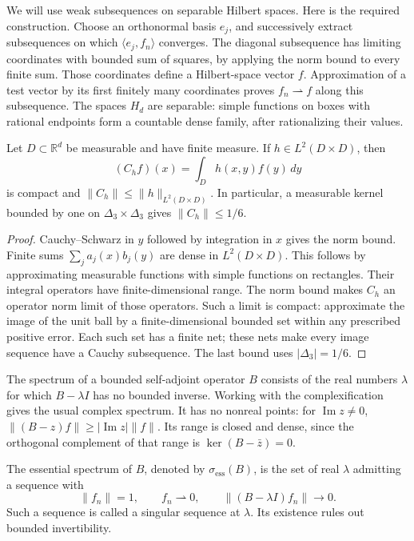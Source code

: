 \documentclass[11pt]{article}
\newcommand{\D}{\Delta}
\newcommand{\ip}[2]{\langle #1,#2\rangle}
\newcommand{\norm}[1]{\lVert #1\rVert}
\begin{document}
We will use weak subsequences on separable Hilbert spaces.
Here is the required construction.  Choose an orthonormal basis $e_j$,
and successively extract subsequences on which $\ip{e_j}{f_n}$ converges.
The diagonal subsequence has limiting coordinates with bounded sum of
squares, by applying the norm bound to every finite sum.
Those coordinates define a Hilbert-space vector $f$.
Approximation of a test vector by its first finitely many coordinates
proves $f_n\rightharpoonup f$ along this subsequence.
The spaces $H_d$ are separable: simple functions on boxes with rational
endpoints form a countable dense family, after rationalizing their values.

\begin{lemma}\label{lem:kernel}
Let $D\subset\mathbb R^d$ be measurable and have finite measure.
If $h\in L^2(D\times D)$, then
\[
                  (C_hf)(x)=\int_D h(x,y)f(y)\,dy
\]
is compact and $\norm{C_h}\leq\norm h_{L^2(D\times D)}$.
In particular, a measurable kernel bounded by one on
$\D_3\times\D_3$ gives $\norm{C_h}\leq1/6$.
\end{lemma}

\begin{proof}
Cauchy--Schwarz in $y$ followed by integration in $x$ gives the norm bound.
Finite sums $\sum_j a_j(x)b_j(y)$ are dense in $L^2(D\times D)$.
This follows by approximating measurable functions with simple functions
on rectangles.  Their integral operators have finite-dimensional range.
The norm bound makes $C_h$ an operator norm limit of those operators.
Such a limit is compact: approximate the image of the unit ball by a
finite-dimensional bounded set within any prescribed positive error.
Each such set has a finite net; these nets make every image sequence
have a Cauchy subsequence.  The last bound uses $|\D_3|=1/6$.
\end{proof}

The spectrum of a bounded self-adjoint operator $B$ consists of the real
numbers $\lambda$ for which $B-\lambda I$ has no bounded inverse.
Working with the complexification gives the usual complex spectrum.
It has no nonreal points: for $\operatorname{Im}z\ne0$,
$\norm{(B-z)f}\geq|\operatorname{Im}z|\norm f$.
Its range is closed and dense, since the orthogonal complement of that
range is $\ker(B-\bar z)=0$.

\begin{definition}\label{def:essential}
The essential spectrum of $B$, denoted by $\sigma_{\mathrm{ess}}(B)$,
is the set of real $\lambda$ admitting a sequence with
\[
 \norm{f_n}=1,\qquad f_n\rightharpoonup0,
                  \qquad\norm{(B-\lambda I)f_n}\to0.
\]
Such a sequence is called a singular sequence at $\lambda$.
Its existence rules out bounded invertibility.
\end{definition}
\end{document}
